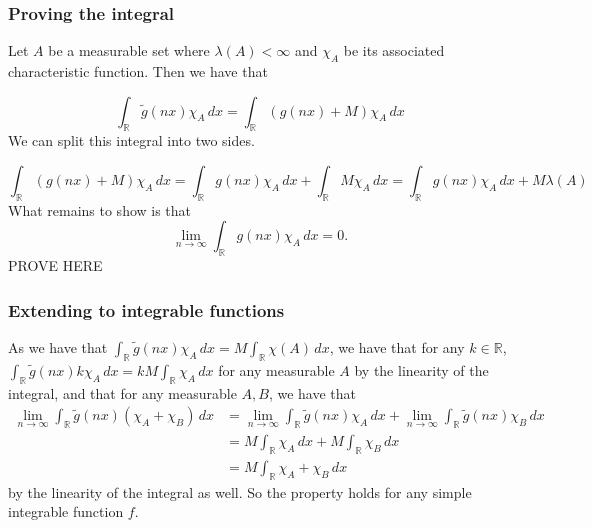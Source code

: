 \documentclass{article}
\theoremstyle{definition}
\numberwithin{theorem}{section}
\numberwithin{equation}{section}
\begin{document}
\subsubsection{Proving the integral}
Let $A$ be a measurable set where $\lambda(A) < \infty$ and $\chi_A$ be its associated characteristic function. Then we have that

\begin{equation}
	\int_{\mathbb{R}} \tilde{g}(nx) \chi_A \, dx = \int_{\mathbb{R}} \left(g(nx) + M\right) \chi_A \, dx
\end{equation}
We can split this integral into two sides. 

\begin{equation}
	\int_{\mathbb{R}} \left(g(nx) + M\right) \chi_A \, dx = \int_{\mathbb{R}}  g(nx) \chi_A \, dx + \int_{\mathbb{R}} M \chi_A \, dx = \int_{\mathbb{R}}  g(nx) \chi_A \, dx + M \lambda(A)
\end{equation}
What remains to show is that
\begin{equation}
	\lim_{n \rightarrow \infty} \int_{\mathbb{R}}  g(nx) \chi_A \, dx = 0. 
\end{equation}
PROVE HERE

\subsubsection{Extending to integrable functions}
As we have that $\int_{\mathbb{R}} \tilde{g}(nx) \chi_A \, dx = M \int_{\mathbb{R}} \chi(A) \, dx$, we have that for any $k \in \mathbb{R}$, $\int_{\mathbb{R}}\tilde{g}(nx) k \chi_A \, dx = k M \int_{\mathbb{R}} \chi_A  \, dx $ for any measurable $A$ by the linearity of the integral, and that for any measurable $A, B$, we have that
\begin{align*}
	\lim_{n \rightarrow \infty} \int_{\mathbb{R}} \tilde{g}(nx) (\chi_A + \chi_B) \, dx &= \lim_{n \rightarrow \infty} \int_{\mathbb{R}} \tilde{g}(nx) \chi_A \, dx + \lim_{n \rightarrow \infty} \int_{\mathbb{R}} \tilde{g}(nx) \chi_B \, dx\\
	&= M \int_{\mathbb{R}} \chi_A \, dx + M \int_{\mathbb{R}} \chi_B \, dx\\
	&= M \int_{\mathbb{R}} \chi_A + \chi_B \, dx 
\end{align*}
 by the linearity of the integral as well. So the property holds for any simple integrable function $f$.
\end{document}

